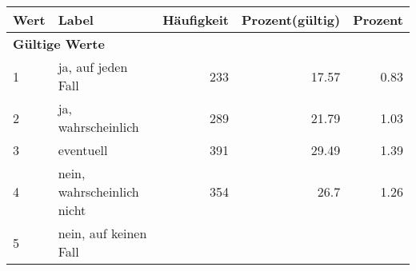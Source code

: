      \begin{longtable}{lXrrr}
     \toprule
     \textbf{Wert} & \textbf{Label} & \textbf{Häufigkeit} & \textbf{Prozent(gültig)} & \textbf{Prozent} \\
     \endhead
     \midrule
     \multicolumn{5}{l}{\textbf{Gültige Werte}}\\

     1 &
     \multicolumn{1}{X}{ ja, auf jeden Fall   } &


       \num{233} &
       \num[round-mode=places,round-precision=2]{17.57} &
         \num[round-mode=places,round-precision=2]{0.83} \\

     2 &
     \multicolumn{1}{X}{ ja, wahrscheinlich   } &


       \num{289} &
       \num[round-mode=places,round-precision=2]{21.79} &
         \num[round-mode=places,round-precision=2]{1.03} \\

     3 &
     \multicolumn{1}{X}{ eventuell   } &


       \num{391} &
       \num[round-mode=places,round-precision=2]{29.49} &
         \num[round-mode=places,round-precision=2]{1.39} \\

     4 &
     \multicolumn{1}{X}{ nein, wahrscheinlich nicht   } &


       \num{354} &
       \num[round-mode=places,round-precision=2]{26.7} &
         \num[round-mode=places,round-precision=2]{1.26} \\

     5 &
     \multicolumn{1}{X}{ nein, auf keinen Fall   } &



\end{longtable}
